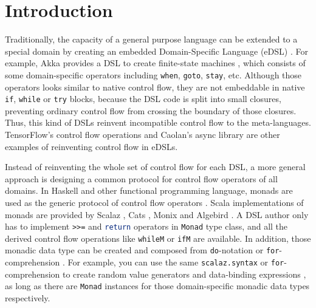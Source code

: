 \section{Introduction}\label{Introduction}

Traditionally, the capacity of a general purpose language can be extended to a special domain by creating an embedded Domain-Specific Language (eDSL) \cite{fowler2010domain} . For example, Akka provides a DSL to create finite-state machines \cite{lightbend2017akka}, which consists of some domain-specific operators including \lstinline{when}, \lstinline{goto}, \lstinline{stay}, etc. Although those operators looks similar to native control flow, they are not embeddable in native \lstinline{if}, \lstinline{while} or \lstinline{try} blocks, because the DSL code is split into small closures, preventing ordinary control flow from crossing the boundary of those closures. Thus, this kind of DSLs reinvent incompatible control flow to the meta-languages. TensorFlow's control flow operations \cite{abadi2016tensorflow} and Caolan's async library \cite{caolan2017async} are other examples of reinventing control flow in eDSLs.

Instead of reinventing the whole set of control flow for each DSL, a more general approach is designing a common protocol for control flow operators of all domains. In Haskell and other functional programming language, monads are used as the generic protocol of control flow operators \cite{wadler1990comprehending,wadler1992essence,jones1993composing}. Scala implementations of monads are provided by Scalaz \cite{kenji2017scalaz}, Cats \cite{typelevel2017cats}, Monix \cite{nedelcu2017monix} and Algebird \cite{twitter2016algebird}. A DSL author only has to implement \lstinline{>>=} and \lstinline[language=Haskell,deletekeywords={return}]{return} operators in \lstinline{Monad} type class, and all the derived control flow operations like \lstinline{whileM} or \lstinline{ifM} are available. In addition, those monadic data type can be created and composed from \lstinline{do}-notation \cite{jones1998haskell} or \lstinline{for}-comprehension \cite{odersky2004scala}. For example, you can use the same \lstinline{scalaz.syntax} or \lstinline{for}-comprehension to create random value generators \cite{nilsson2015scalacheck} and data-binding expressions \cite{yangbo2016binding}, as long as there are \lstinline{Monad} instances for those domain-specific monadic data types respectively.

